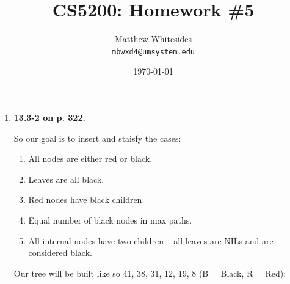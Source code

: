 \documentclass{article}
\title{CS5200: Homework \#5} %
\author{Matthew Whitesides\\ \texttt{mbwxd4@umsystem.edu}} %
\date{\today} %
\begin{document}
  \maketitle %
 
  \begin{enumerate}
    \item \textbf{13.3-2 on p. 322.}
    
    So our goal is to insert and staisfy the cases:

    \begin{enumerate}
      \item All nodes are either red or black.
      \item Leaves are all black.
      \item Red nodes have black children.
      \item Equal number of black nodes in max paths.
      \item All internal nodes have two children – all leaves are NILs and are considered black.
    \end{enumerate}

    Our tree will be built like so {41, 38, 31, 12, 19, 8} (B = Black, R = Red):


\end{enumerate}
\end{document}
